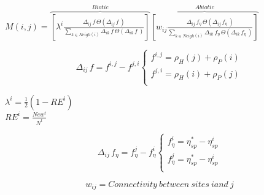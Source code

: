 \vspace{0.25cm}
\small{$M(i,j) = \overbrace{ \left[ \lambda^{i} \frac{ \Delta_{ij}\,f\,\Theta \left(\Delta_{ij}\,f\,\right) }{ \sum_{k \in Neigh\left(i\right)}\Delta_{ik}\,f\,\Theta \left(\Delta_{ik}\,f\,\right) }\right]}^{Biotic} \overbrace{\left[w_{ij} \frac{ \Delta_{ij}\,f_{\eta}\,\Theta \left(\Delta_{ij}\,f_{\eta}\,\right) }{ \sum_{k \in Neigh\left(i\right)}\Delta_{ik}\,f_{\eta}\,\Theta \left(\Delta_{ik}\,f_{\eta}\,\right) }\right]}^{Abiotic}$}

\vspace{0.5cm}
$$
\Delta_{ij}\,f = f^{i,j} - f^{j,i}\left\{ \begin{array}{rl}
 f^{i,j} = \rho_{H}(j) + \rho_{P}(i) \\
 f^{j,i} = \rho_{H}(i) + \rho_{P}(j) \\
       \end{array} \right.
$$

\vspace{0.5cm}
\centering $\lambda^{i} = \frac{1}{2} \left( 1 - RE^{i} \right)$ \\

\vspace{0.25cm}
\centering $ RE^{i} = \frac{ New^{t} }{ N^{t} }$

\vspace{0.25cm}
$$
 \Delta_{ij}\,f_{\eta} = f_{\eta}^{j} - f_{\eta}^{i} \left\{ \begin{array}{rl}
 f_{\eta}^{i} = \eta_{sp}^{*} - \eta_{sp}^{i} \\
 f_{\eta}^{j} = \eta_{sp}^{*} - \eta_{sp}^{i} \\
       \end{array} \right.
$$

\vspace{0.25cm}
$$w_{ij} = Connectivity \: between \: sites \: i and \: j$$


\vspace{1cm}

